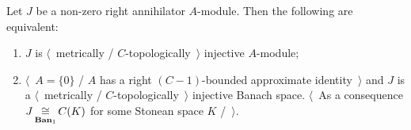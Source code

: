 \begin{proposition}\label{MetTopInjOfAnnihModCharac} Let $J$ be a non-zero right
annihilator $A$-module. Then the following are equivalent:

\begin{enumerate}[label = (\roman*)]
    \item $J$ is $\langle$~metrically / $C$-topologically~$\rangle$ injective
    $A$-module;

    \item $\langle$~$A= \{0 \}$ / $A$ has a right $(C-1)$-bounded approximate
    identity~$\rangle$ and $J$ is a $\langle$~metrically /
    $C$-topologically~$\rangle$ injective Banach space. $\langle$~As a
    consequence $J\mathop{\mathbin{\cong}}\limits_{\mathbf{Ban}_1}C(K)$ for some Stonean space $K$
    /~$\rangle$.
\end{enumerate}
\end{proposition}
